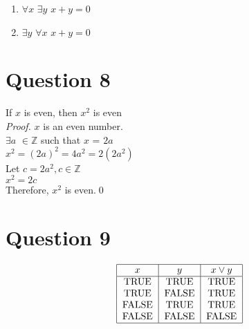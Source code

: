 \documentclass{article}
\newcommand{\Z}{\mathbb{Z}}
\begin{document}
    \begin{enumerate} 
    \item$\forall x$ $\exists y$ $x + y = 0$ 
    \item$\exists y$ $\forall x$ $x + y = 0$ \\ 
    \end{enumerate}

    \section*{Question 8}
    
    If $x$ is even, then $x^2$ is even \smallskip\smallskip \\ 
    \emph{Proof.} $x$ is an even number.\\
    $\exists a$ $\in\Z$ such that $x$ = $2a$ \\
    $x^2 = (2a)^2 = 4a^2 = 2(2a^2)$ \\
    Let $c = 2a^2, c\in\Z$ \\
    $x^2 = 2c$ \\
    Therefore, $x^2$ is even.\qed
    
     \section*{Question 9}
    \[\begin{tabular}{|c|c|c|}
    \hline
    $x$ & $y$ & $x\vee y$\\
    \hline
    TRUE & TRUE & TRUE \\
    TRUE & FALSE & TRUE \\
    FALSE & TRUE & TRUE \\
    FALSE & FALSE & FALSE\\
    \hline
    \end{tabular}\]
       
\end{document}
